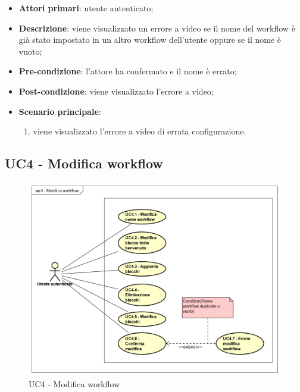 \begin{itemize}
\item \textbf{Attori primari}: utente autenticato;

\item \textbf{Descrizione}: viene visualizzato un errore a video se il nome del workflow è già stato impostato in un altro workflow dell'utente oppure se il nome è vuoto;

\item \textbf{Pre-condizione}: l'attore ha confermato e il nome è errato;

\item \textbf{Post-condizione}: viene visualizzato l'errore a video;

\item \textbf{Scenario principale}:
\begin{enumerate}
\item viene visualizzato l'errore a video di errata configurazione.
\end{enumerate}
\end{itemize}

\subsection{UC4 - Modifica workflow}

\begin{figure}[H]
    \centering
    \includegraphics[scale=0.45]{immagini/UC4.png}
    \caption{UC4 - Modifica workflow \label{fig:uc4}}
\end{figure}


